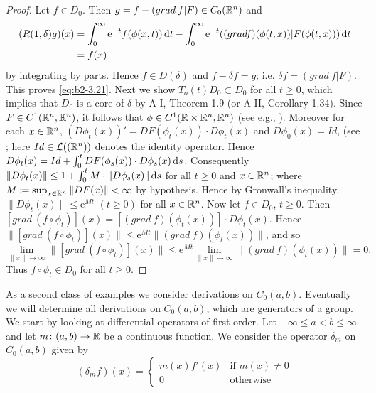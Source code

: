 \begin{proof}
Let $f \in D_{0}$.
Then $g = f - (grad\: f | F) \in C_{0}(\mathbb{R}^{n})$ and
\[
\begin{split}
(R(1,\delta)g)(x) 
&= \int_{0}^{\infty} \mathrm{e}^{-t}f(\phi(x,t)) \mathop{}\!\mathrm{d}{t} - \int_{0}^{\infty} \mathrm{e}^{-t}((gradf)(\phi(t,x)) | F(\phi(t,x))) \mathop{}\!\mathrm{d}{t} \\
&= f(x)
\end{split}
\]
 by integrating by parts.
Hence $f \in D(\delta)$ and $f - \delta f = g$; i.e. $\delta f = (grad\: f|F)$.
This proves \eqref{eq:b2-3.21}.
Next we show $T_{o}(t)D_{0} \subset D_{0}$ for all $t \geq 0$, which implies that $D_{0}$ is a core of $\delta$ by A-I, Theorem 1.9 (or A-II, Corollary 1.34). 
Since $F \in C^{1}(\mathbb{R}^{n},\mathbb{R}^{n})$, it follows that $\phi \in C^{1}(\mathbb{R} \times \mathbb{R}^{n},\mathbb{R}^{n})$ (see e.g., \citet[15.2]{hirschsmale:1974}).
Moreover for each $x \in \mathbb{R}^{n}$, $(D\phi_{t}(x))' = DF(\phi_{t}(x)) \cdot D\phi_{t}(x)$ and $D\phi_{0}(x) = Id$, (see \citet[p. 300]{hirschsmale:1974}; here $Id \in \mathcal{L}((\mathbb{R}^{n}))$ denotes the identity operator.
Hence $D\phi_{t}(x) = Id + \int_{0}^{t} DF(\phi_{s}(x)) \cdot D\phi_{s}(x) \mathop{}\!\mathrm{d}{s}$.
Consequently $\|D\phi_{t}(x)\| \leq 1 + \int_{0}^{t}  M \cdot  \|D\phi_{s}(x)\| \mathop{}\!\mathrm{d}{s}$ for all $t \geq 0$ and $x \in \mathbb{R}^{n}$; where $M \coloneqq \sup_{x \in \mathbb{R}^{n}} \|DF(x)\| < \infty$ by hypothesis.
Hence by Gronwall's inequality, $\|D\phi_{t}(x)\| \leq \mathrm{e}^{Mt}$ $(t \geq 0)$ for all $x \in \mathbb{R}^{n}$.
Now let $f \in D_{0}$, $t \geq 0$.
Then $[grad\:(f \circ \phi_{t})](x) = [(grad\:f)(\phi_{t}(x))] \cdot D\phi_{t}(x)$.
Hence $\|[grad\:(f \circ \phi_{t})](x)\| \leq \mathrm{e}^{Mt}\|(grad\:f)(\phi_{t}(x))\|$, and so 
\[
\lim_{\|x\| \to \infty} \|[grad\:(f \circ \phi_{t})](x)\| \leq \mathrm{e}^{Mt} \lim_{\|x\| \to \infty} \|(grad\:f)(\phi_{t}(x))\| = 0.
\]
Thus $f \circ \phi_{t} \in D_{0}$ for all $t \geq 0$.
\end{proof}
As a second class of examples we consider derivations on $C_{0}(a,b)$.
Eventually we will determine all derivations on $C_{0}(a,b)$, which are generators of a group.
We start by looking at differential operators of first order.
Let $-\infty \leq a < b \leq \infty$ and let $m \colon (a,b) \to \mathbb{R}$ be a continuous function.
We consider the operator $\delta_{m}$ on $C_{0}(a,b)$ given by
\begin{equation*}\label{eq:b2-delta-m}
(\delta_{m}f)(x) = \begin{cases}
    m(x)f'(x) & \text{if } m(x) \neq 0 \\
    0 & \text{otherwise}
\end{cases}
\end{equation*}
